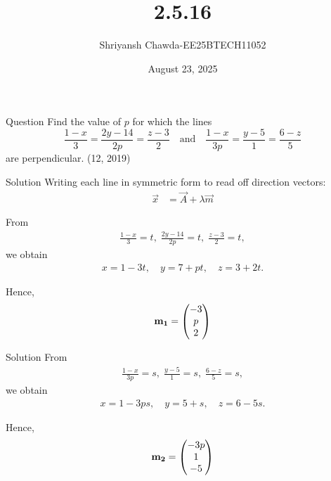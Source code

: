 \documentclass{beamer}
\title{2.5.16}
\author{Shriyansh Chawda-EE25BTECH11052}
\date{August 23, 2025}
\begin{document}
	
	\frame{\titlepage}
	
	\begin{frame}{Question} 
		Find the value of $p$ for which the lines
		\[
		\frac{1-x}{3} = \frac{2y-14}{2p} = \frac{z-3}{2} 
		\quad \text{and} \quad 
		\frac{1-x}{3p} = \frac{y-5}{1} = \frac{6-z}{5} 
		\]
		are perpendicular. 
		\hfill (12, 2019)
	\end{frame}
	
	\begin{frame}{Solution}
		Writing each line in symmetric form to read off direction vectors:
		\begin{align}
			\vec{x} &= \vec{A} + \lambda \vec{m}
		\end{align}
		
		From
		\begin{align}
			\frac{1-x}{3}=t,\;
			\frac{2y-14}{2p}=t,\;
			\frac{z-3}{2}=t,
		\end{align}
		we obtain
		\begin{align}
			x = 1-3t,\quad
			y = 7+pt,\quad
			z = 3+2t.
		\end{align}
		
		Hence,
	\begin{align}
		\mathbf{m_1} = \begin{pmatrix}-3 \\ p \\ 2\end{pmatrix}
	\end{align}
	\end{frame}
	
	\begin{frame}{Solution}
		From
		\begin{align}
			\frac{1-x}{3p}=s,\;
			\frac{y-5}{1}=s,\;
			\frac{6-z}{5}=s,
		\end{align}
		we obtain
		\begin{align}
			x = 1-3ps,\quad
			y = 5+s,\quad
			z = 6-5s.
		\end{align}
		
		Hence,
\begin{align}
		\mathbf{m_2} = \begin{pmatrix}-3p \\ 1 \\ -5\end{pmatrix}
\end{align}
	\end{frame}
	
\end{document}
